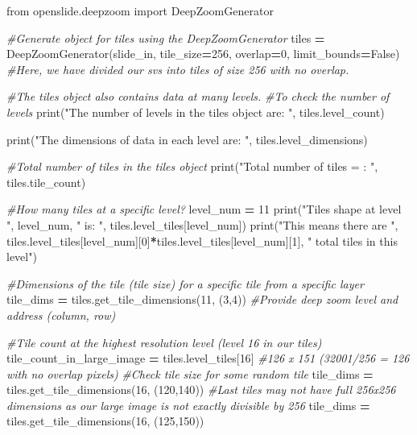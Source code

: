 \documentclass[
]{book}
\newenvironment{Shaded}{\begin{snugshade}}{\end{snugshade}}
\newcommand{\BuiltInTok}[1]{#1}
\newcommand{\CommentTok}[1]{\textcolor[rgb]{0.56,0.35,0.01}{\textit{#1}}}
\newcommand{\DecValTok}[1]{\textcolor[rgb]{0.00,0.00,0.81}{#1}}
\newcommand{\ImportTok}[1]{#1}
\newcommand{\NormalTok}[1]{#1}
\newcommand{\OperatorTok}[1]{\textcolor[rgb]{0.81,0.36,0.00}{\textbf{#1}}}
\newcommand{\StringTok}[1]{\textcolor[rgb]{0.31,0.60,0.02}{#1}}
\newcommand{\VariableTok}[1]{\textcolor[rgb]{0.00,0.00,0.00}{#1}}
\begin{document}
\begin{Shaded}
\begin{Highlighting}[]
\ImportTok{from}\NormalTok{ openslide.deepzoom }\ImportTok{import}\NormalTok{ DeepZoomGenerator}

\CommentTok{\#Generate object for tiles using the DeepZoomGenerator}
\NormalTok{tiles }\OperatorTok{=}\NormalTok{ DeepZoomGenerator(slide\_in, tile\_size}\OperatorTok{=}\DecValTok{256}\NormalTok{, overlap}\OperatorTok{=}\DecValTok{0}\NormalTok{, limit\_bounds}\OperatorTok{=}\VariableTok{False}\NormalTok{)}
\CommentTok{\#Here, we have divided our svs into tiles of size 256 with no overlap. }

\CommentTok{\#The tiles object also contains data at many levels. }
\CommentTok{\#To check the number of levels}
\BuiltInTok{print}\NormalTok{(}\StringTok{"The number of levels in the tiles object are: "}\NormalTok{, tiles.level\_count)}

\BuiltInTok{print}\NormalTok{(}\StringTok{"The dimensions of data in each level are: "}\NormalTok{, tiles.level\_dimensions)}

\CommentTok{\#Total number of tiles in the tiles object}
\BuiltInTok{print}\NormalTok{(}\StringTok{"Total number of tiles = : "}\NormalTok{, tiles.tile\_count)}

\CommentTok{\#How many tiles at a specific level?}
\NormalTok{level\_num }\OperatorTok{=} \DecValTok{11}
\BuiltInTok{print}\NormalTok{(}\StringTok{"Tiles shape at level "}\NormalTok{, level\_num, }\StringTok{" is: "}\NormalTok{, tiles.level\_tiles[level\_num])}
\BuiltInTok{print}\NormalTok{(}\StringTok{"This means there are "}\NormalTok{, tiles.level\_tiles[level\_num][}\DecValTok{0}\NormalTok{]}\OperatorTok{*}\NormalTok{tiles.level\_tiles[level\_num][}\DecValTok{1}\NormalTok{], }\StringTok{" total tiles in this level"}\NormalTok{)}

\CommentTok{\#Dimensions of the tile (tile size) for a specific tile from a specific layer}
\NormalTok{tile\_dims }\OperatorTok{=}\NormalTok{ tiles.get\_tile\_dimensions(}\DecValTok{11}\NormalTok{, (}\DecValTok{3}\NormalTok{,}\DecValTok{4}\NormalTok{)) }\CommentTok{\#Provide deep zoom level and address (column, row)}


\CommentTok{\#Tile count at the highest resolution level (level 16 in our tiles)}
\NormalTok{tile\_count\_in\_large\_image }\OperatorTok{=}\NormalTok{ tiles.level\_tiles[}\DecValTok{16}\NormalTok{] }\CommentTok{\#126 x 151 (32001/256 = 126 with no overlap pixels)}
\CommentTok{\#Check tile size for some random tile}
\NormalTok{tile\_dims }\OperatorTok{=}\NormalTok{ tiles.get\_tile\_dimensions(}\DecValTok{16}\NormalTok{, (}\DecValTok{120}\NormalTok{,}\DecValTok{140}\NormalTok{))}
\CommentTok{\#Last tiles may not have full 256x256 dimensions as our large image is not exactly divisible by 256}
\NormalTok{tile\_dims }\OperatorTok{=}\NormalTok{ tiles.get\_tile\_dimensions(}\DecValTok{16}\NormalTok{, (}\DecValTok{125}\NormalTok{,}\DecValTok{150}\NormalTok{))}



\end{Highlighting}
\end{Shaded}
\end{document}
